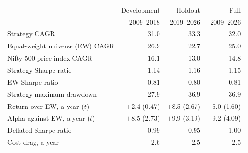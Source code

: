 \begin{tabular}{@{}lrrr@{}}
\toprule
 & Development & Holdout & Full \\
 & 2009--2018 & 2019--2026 & 2009--2026 \\
\midrule
Strategy CAGR & 31.0 & 33.3 & 32.0 \\
Equal-weight universe (EW) CAGR & 26.9 & 22.7 & 25.0 \\
Nifty 500 price index CAGR & 16.1 & 13.0 & 14.8 \\
Strategy Sharpe ratio & 1.14 & 1.16 & 1.15 \\
EW Sharpe ratio & 0.81 & 0.80 & 0.81 \\
Strategy maximum drawdown & $-$27.9 & $-$36.9 & $-$36.9 \\
Return over EW, a year ($t$) & $+$2.4 (0.47) & $+$8.5 (2.67) & $+$5.0 (1.60) \\
Alpha against EW, a year ($t$) & $+$8.5 (2.73) & $+$9.9 (3.19) & $+$9.2 (4.09) \\
Deflated Sharpe ratio & 0.99 & 0.95 & 1.00 \\
Cost drag, a year & 2.6 & 2.5 & 2.5 \\
\bottomrule
\end{tabular}

